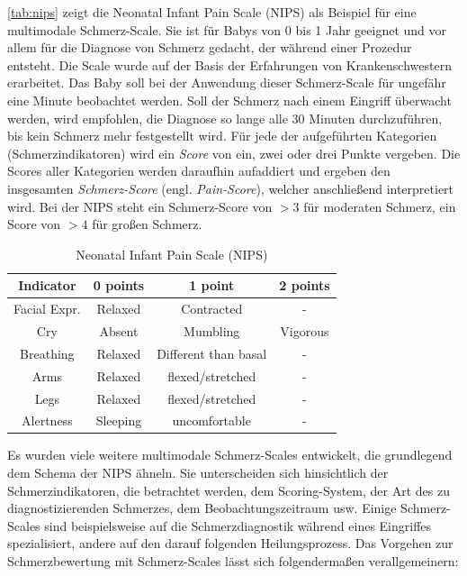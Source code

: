 \autoref{tab:nips} zeigt die \glqq Neonatal Infant Pain Scale\grqq{} (NIPS) als Beispiel für eine multimodale Schmerz-Scale. Sie ist für Babys von 0 bis 1 Jahr geeignet und vor allem für die Diagnose von Schmerz gedacht, der während einer Prozedur entsteht. Die Scale wurde auf der Basis der Erfahrungen von Krankenschwestern erarbeitet. Das Baby soll bei der Anwendung dieser Schmerz-Scale für ungefähr eine Minute beobachtet werden. Soll der Schmerz nach einem Eingriff überwacht werden, wird empfohlen, die Diagnose so lange alle 30 Minuten durchzuführen, bis kein Schmerz mehr festgestellt wird. Für jede der aufgeführten Kategorien (Schmerzindikatoren) wird ein \emph{Score} von ein, zwei oder drei Punkte vergeben. Die Scores aller Kategorien werden daraufhin aufaddiert und ergeben den insgesamten \emph{Schmerz-Score} (engl. \emph{Pain-Score}), welcher anschließend interpretiert wird. Bei der NIPS steht ein Schmerz-Score von $>3$ für \glqq moderaten Schmerz\grqq , ein Score von $>4$ für \glqq großen Schmerz\grqq.\cite{nips} \cite[S. 98]{painInNeonates}

\begin{table}[h]

	\centering
	\caption[Neonatal Infant Pain Scale]{Neonatal Infant Pain Scale (NIPS) \cite{nips}}
	\label{tab:nips}
	\begin{tabular}{@{}cccc@{}}
		\toprule
		\textbf{Indicator}     & \textbf{0 points} & \textbf{1 point}     & \textbf{2 points} \\ \midrule
		Facial Expr. & Relaxed           & Contracted           & -                 \\
		Cry               & Absent            & Mumbling             & Vigorous          \\
		Breathing         & Relaxed           & Different than basal & -                 \\
		Arms              & Relaxed           & flexed/stretched     & -                 \\
		Legs              & Relaxed           & flexed/stretched     & -                 \\
		Alertness         & Sleeping          & uncomfortable        & -                 \\ \bottomrule
	\end{tabular}
\end{table}


Es wurden viele weitere multimodale Schmerz-Scales entwickelt, die grundlegend dem Schema der NIPS ähneln. Sie unterscheiden sich hinsichtlich der Schmerzindikatoren, die betrachtet werden, dem Scoring-System, der Art des zu diagnostizierenden Schmerzes, dem Beobachtungszeitraum usw. Einige Schmerz-Scales sind beispielsweise auf die Schmerzdiagnostik während eines Eingriffes spezialisiert, andere auf den darauf folgenden Heilungsprozess. Das Vorgehen zur Schmerzbewertung mit Schmerz-Scales lässt sich folgendermaßen verallgemeinern:

